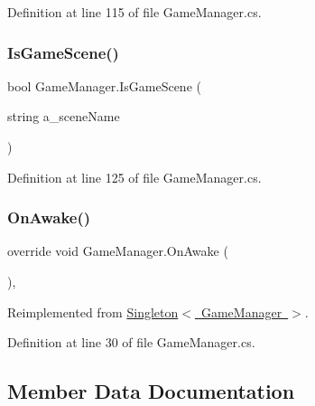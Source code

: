 Definition at line 115 of file Game\+Manager.\+cs.

\mbox{\label{class_game_manager_ab83c7c6f5531d0591b0697fdf340a16c}} 
\subsubsection{\texorpdfstring{Is\+Game\+Scene()}{IsGameScene()}}
{\footnotesize\ttfamily bool Game\+Manager.\+Is\+Game\+Scene (\begin{DoxyParamCaption}\item[{string}]{a\+\_\+scene\+Name }\end{DoxyParamCaption})}



Definition at line 125 of file Game\+Manager.\+cs.

\mbox{\label{class_game_manager_a30d19f2d0dbdc657e6f216a99e4be4af}} 
\subsubsection{\texorpdfstring{On\+Awake()}{OnAwake()}}
{\footnotesize\ttfamily override void Game\+Manager.\+On\+Awake (\begin{DoxyParamCaption}{ }\end{DoxyParamCaption})\hspace{0.3cm}{\ttfamily [protected]}, {\ttfamily [virtual]}}



Reimplemented from \mbox{\hyperlink{class_singleton_aac558b29781a363c0845b0359c8f85ff}{Singleton$<$ Game\+Manager $>$}}.



Definition at line 30 of file Game\+Manager.\+cs.



\subsection{Member Data Documentation}
\mbox{\label{class_game_manager_aa59964143f46f6d366aa576ab08c5a15}} 
